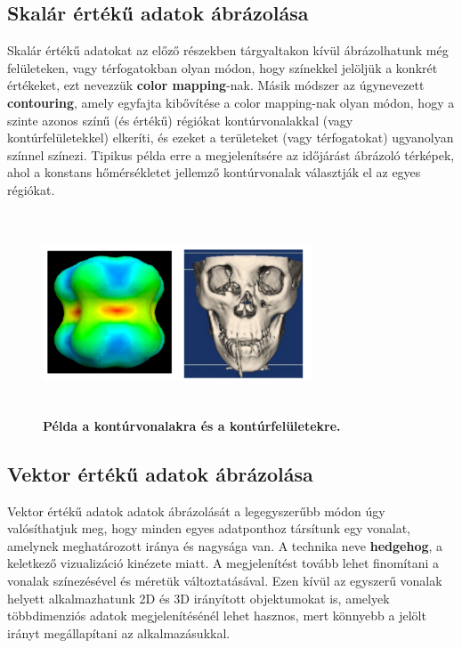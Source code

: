 \documentclass[12pt]{article}
\theoremstyle{plain}
\begin{document}
\subsection{Skalár értékű adatok ábrázolása}

Skalár értékű adatokat az előző részekben tárgyaltakon kívül ábrázolhatunk még felületeken, vagy térfogatokban olyan módon, hogy színekkel jelöljük a konkrét értékeket, ezt nevezzük \textbf{color mapping}-nak. 
Másik módszer az úgynevezett \textbf{contouring}, amely egyfajta kibővítése a color mapping-nak olyan módon, hogy a szinte azonos színű (és értékű) régiókat kontúrvonalakkal (vagy kontúrfelületekkel) elkeríti, és ezeket a területeket (vagy térfogatokat) ugyanolyan színnel színezi. Tipikus példa erre a megjelenítsére az időjárást ábrázoló térképek, ahol a konstans hőmérsékletet jellemző kontúrvonalak választják el az egyes régiókat.

\begin{figure}[H]
   \centering
   \includegraphics[width=8cm, height=6cm]{media/iso.PNG}
   \caption{\textbf{Példa a kontúrvonalakra és a kontúrfelületekre.}}
   \label{fig:GeneralDiagram}
\end{figure}

\subsection{Vektor értékű adatok ábrázolása}
Vektor értékű adatok adatok ábrázolását a legegyszerűbb módon úgy valósíthatjuk meg, hogy minden egyes adatponthoz társítunk egy vonalat, amelynek meghatározott iránya és nagysága van. A technika neve \textbf{hedgehog}, a keletkező vizualizáció kinézete miatt. A megjelenítést tovább lehet finomítani a vonalak színezésével és méretük változtatásával. Ezen kívül az egyszerű vonalak helyett alkalmazhatunk 2D és 3D irányított objektumokat is, amelyek többdimenziós adatok megjelenítésénél lehet hasznos, mert könnyebb a jelölt irányt megállapítani az alkalmazásukkal.
\end{document}
